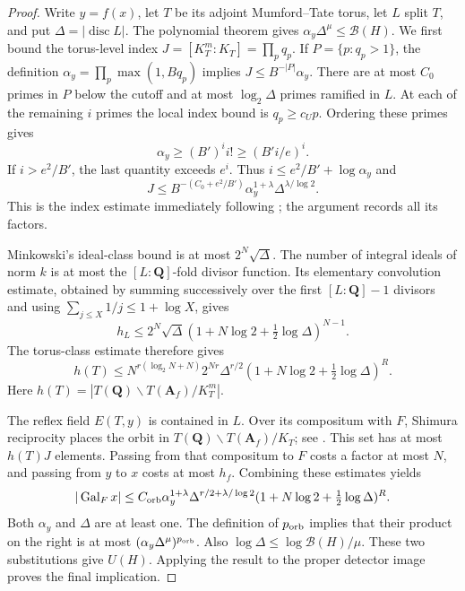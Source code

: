 \documentclass[11pt]{article}
\theoremstyle{definition}
\theoremstyle{remark}
\newcommand{\Q}{\mathbf Q}
\newcommand{\Gal}{\operatorname{Gal}}
\begin{document}
\begin{proof}
Write $y=f(x)$, let $T$ be its adjoint Mumford--Tate torus,
let $L$ split $T$, and put $\Delta=|\operatorname{disc}L|$.
The polynomial theorem gives
$\alpha_y\Delta^\mu\leq\mathcal B(H)$.
We first bound the torus-level index
$J=[K_T^m:K_T]=\prod_p q_p$.
If $P=\{p:q_p>1\}$, the definition
$\alpha_y=\prod_p\max(1,Bq_p)$ implies
$J\leq B^{-|P|}\alpha_y$.
There are at most $C_0$ primes in $P$ below the cutoff and
at most $\log_2\Delta$ primes ramified in $L$.
At each of the remaining $i$ primes the local index bound is
$q_p\geq c_Up$.  Ordering these primes gives
\[
 \alpha_y\geq (B')^i i!\geq (B'i/e)^i.
\]
If $i>e^2/B'$, the last quantity exceeds $e^i$.
Thus $i\leq e^2/B'+\log\alpha_y$ and
\begin{equation}\label{eq:level-orbit-upper}
 J\leq B^{-(C_0+e^2/B')}
       \alpha_y^{1+\lambda}\Delta^{\lambda/\log2}.
\end{equation}
This is the index estimate immediately following
\cite[Proposition~6.6]{Jaswal}; the argument records all its factors.

Minkowski's ideal-class bound is at most $2^N\sqrt\Delta$.
The number of integral ideals of norm $k$ is at most the
$[L:\Q]$-fold divisor function.  Its elementary convolution
estimate, obtained by summing successively over the first
$[L:\Q]-1$ divisors and using
$\sum_{j\leq X}1/j\leq1+\log X$, gives
\[
 h_L\leq2^N\sqrt\Delta
       (1+N\log2+\tfrac12\log\Delta)^{N-1}.
\]
The torus-class estimate
\cite[Proposition~9.7]{Jaswal} therefore gives
\[
 h(T)\leq N^{r(\log_2N+N)}
       2^{Nr}\Delta^{r/2}
       (1+N\log2+\tfrac12\log\Delta)^R.
\]
Here $h(T)=|T(\Q)\backslash T(\mathbf A_f)/K_T^m|$.

The reflex field $E(T,y)$ is contained in $L$.
Over its compositum with $F$, Shimura reciprocity places the
orbit in $T(\Q)\backslash T(\mathbf A_f)/K_T$;
see \cite[\S2.1]{UllmoYafaev}.
This set has at most $h(T)J$ elements.
Passing from that compositum to $F$ costs a factor at most $N$,
and passing from $y$ to $x$ costs at most $h_f$.
Combining these estimates yields
\[
 |\Gal_Fx|\leq C_{\rm orb}
 \alpha_y^{1+\lambda}\Delta^{r/2+\lambda/\log2}
 (1+N\log2+\tfrac12\log\Delta)^R.
\]
Both $\alpha_y$ and $\Delta$ are at least one.  The definition
of $p_{\rm orb}$ implies that their product on the right is
at most $(\alpha_y\Delta^\mu)^{p_{\rm orb}}$.
Also $\log\Delta\leq\log\mathcal B(H)/\mu$.
These two substitutions give $U(H)$.  Applying the result to
the proper detector image proves the final implication.
\end{proof}
\end{document}
